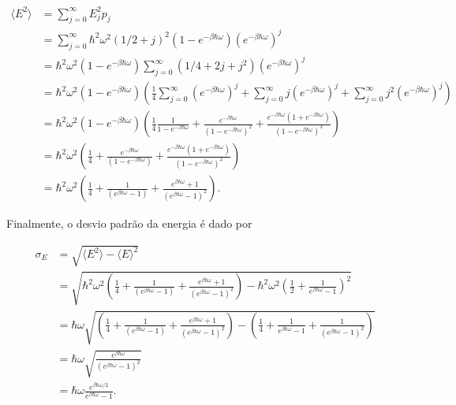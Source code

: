\documentclass[11pt]{article}
\begin{document}
\begin{align}
\langle E^{2}\rangle & = \sum_{j=0}^{\infty} E_{j}^{2}p_{j} \\
                     & = \sum_{j=0}^{\infty} \hbar^{2}\omega^{2}(1/2+j)^{2}(1-e^{-\beta\hbar\omega})(e^{-\beta\hbar\omega})^{j} \\
                     & = \hbar^{2}\omega^{2}(1-e^{-\beta\hbar\omega})\sum_{j=0}^{\infty} (1/4+2j+j^{2})(e^{-\beta\hbar\omega})^{j} \\
                     & = \hbar^{2}\omega^{2}(1-e^{-\beta\hbar\omega}) \left( \frac{1}{4}\sum_{j=0}^{\infty}(e^{-\beta\hbar\omega})^{j} + \sum_{j=0}^{\infty}j(e^{-\beta\hbar\omega})^{j} + \sum_{j=0}^{\infty}j^{2}(e^{-\beta\hbar\omega})^{j} \right) \\
                     & = \hbar^{2}\omega^{2}(1-e^{-\beta\hbar\omega}) \left( \frac{1}{4}\frac{1}{1-e^{-\beta\hbar\omega}} + \frac{e^{-\beta\hbar\omega}}{\left(1-e^{-\beta\hbar\omega}\right)^{2}} + \frac{e^{-\beta\hbar\omega}(1+e^{-\beta\hbar\omega})}{(1-e^{-\beta\hbar\omega})^{3}} \right) \\
                     & = \hbar^{2}\omega^{2} \left( \frac{1}{4} + \frac{e^{-\beta\hbar\omega}}{\left(1-e^{-\beta\hbar\omega}\right)} + \frac{e^{-\beta\hbar\omega}(1+e^{-\beta\hbar\omega})}{(1-e^{-\beta\hbar\omega})^{2}} \right) \\
                     & = \hbar^{2}\omega^{2} \left( \frac{1}{4} + \frac{1}{\left(e^{\beta\hbar\omega}-1\right)} + \frac{e^{\beta\hbar\omega}+1}{(e^{\beta\hbar\omega}-1)^{2}} \right).
\end{align}

Finalmente, o desvio padrão da energia é dado por

\begin{align}
\sigma_{E} & = \sqrt{\langle E^{2}\rangle - \langle E\rangle^{2}} \\
           & = \sqrt{\hbar^{2}\omega^{2} \left( \frac{1}{4} + \frac{1}{\left(e^{\beta\hbar\omega}-1\right)} + \frac{e^{\beta\hbar\omega}+1}{(e^{\beta\hbar\omega}-1)^{2}} \right) - \hbar^{2}\omega^{2}\left(\frac{1}{2} + \frac{1}{e^{\beta\hbar\omega}-1}\right)^{2}} \\
           & = \hbar\omega\sqrt{ \left( \frac{1}{4} + \frac{1}{\left(e^{\beta\hbar\omega}-1\right)} + \frac{e^{\beta\hbar\omega}+1}{(e^{\beta\hbar\omega}-1)^{2}} \right) - \left(\frac{1}{4} + \frac{1}{e^{\beta\hbar\omega}-1} + \frac{1}{(e^{\beta\hbar\omega}-1)^{2}}\right)} \\
           & = \hbar\omega\sqrt{\frac{e^{\beta\hbar\omega}}{(e^{\beta\hbar\omega}-1)^{2}}} \\
           & = \hbar\omega\frac{e^{\beta\hbar\omega/2}}{e^{\beta\hbar\omega}-1}.
\end{align}
\end{document}
